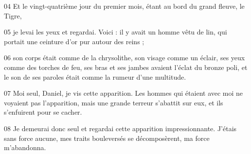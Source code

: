 04 Et le vingt-quatrième jour du premier mois, étant au bord du grand fleuve, le Tigre,

05 je levai les yeux et regardai. Voici : il y avait un homme vêtu de lin, qui portait une ceinture d’or pur autour des reins ;

06 son corps était comme de la chrysolithe, son visage comme un éclair, ses yeux comme des torches de feu, ses bras et ses jambes avaient l’éclat du bronze poli, et le son de ses paroles était comme la rumeur d’une multitude.

07 Moi seul, Daniel, je vis cette apparition. Les hommes qui étaient avec moi ne voyaient pas l’apparition, mais une grande terreur s’abattit sur eux, et ils s’enfuirent pour se cacher.

08 Je demeurai donc seul et regardai cette apparition impressionnante. J’étais sans force aucune, mes traits bouleversés se décomposèrent, ma force m’abandonna.
